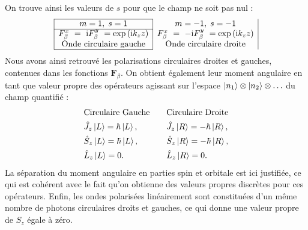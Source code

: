 On trouve ainsi les valeurs de $s$ pour que le champ ne soit pas nul :
\[
\begin{array}{|c|c|}
		\hline
		m = 1,\;s = 1&m = -1,\;s = -1\\
		\hline
		F_{\beta}^x ~= ~\rmi F_{\beta}^y ~= \exp{(\rmi k_zz)} & F_{\beta}^x ~= ~-\rmi F_{\beta}^y ~= \exp{(\rmi k_zz)}\\
		\text{Onde circulaire gauche} & \text{Onde circulaire droite}\\
		\hline
\end{array}\]
Nous avons ainsi retrouvé les polarisations circulaires droites et gauches, contenues dans les fonctions $\bm{F}_{\beta}$. On obtient également leur moment angulaire en tant que valeur propre des opérateurs agissant sur l'espace $\ket{n_1}\otimes\ket{n_2}\otimes\ldots$ du champ quantifié :
\begin{equation}
\begin{aligned}[c]
&\text{Circulaire Gauche}\\
&\hat{J}_z\ket{L} = \hbar\ket{L},\\
&\hat{S}_z\ket{L} = \hbar\ket{L},\\
&\hat{L}_z\ket{L} = 0.
\end{aligned}
\qquad
\begin{aligned}[c]
&\text{Circulaire Droite}\\
&\hat{J}_z\ket{R} = -\hbar\ket{R},\\
&\hat{S}_z\ket{R} = -\hbar\ket{R},\\
&\hat{L}_z\ket{R} = 0.
\end{aligned}
\end{equation}
La séparation du moment angulaire en parties spin et orbitale est ici justifiée, ce qui est cohérent avec le fait qu'on obtienne des valeurs propres discrètes pour ces opérateurs. Enfin, les ondes polarisées linéairement sont constituées d'un même nombre de photons circulaires droits et gauches, ce qui donne une valeur propre de $S_z$ égale à zéro.

